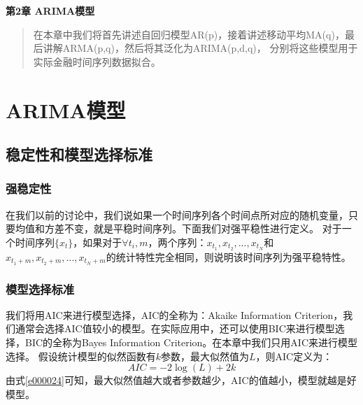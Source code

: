 \newpage
\maketitle
\begin{center}
\Large \textbf{第2章 ARIMA模型} \quad 
\end{center}
\begin{abstract}
在本章中我们将首先讲述自回归模型AR(p)，接着讲述移动平均MA(q)，最后讲解ARMA(p,q)，然后将其泛化为ARIMA(p,d,q)，
分别将这些模型用于实际金融时间序列数据拟合。
\end{abstract}
\section{ARIMA模型}
\subsection{稳定性和模型选择标准}
\subsubsection{强稳定性}
在我们以前的讨论中，我们说如果一个时间序列各个时间点所对应的随机变量，只要均值和方差不变，就是平稳时间序列。下面我们对强平稳性进行定义。\newline
对于一个时间序列$\{ x_{t} \}$，如果对于$\forall t_{i},m$，两个序列：$x_{t_1}, x_{t_2},...,x_{t_N}$和$x_{t_1+m}, x_{t_2+m},...,x_{t_N+m}$的统计特性完全相同，则说明该时间序列为强平稳特性。
\subsubsection{模型选择标准}
我们将用AIC来进行模型选择，AIC的全称为：Akaike Information Criterion，我们通常会选择AIC值较小的模型。在实际应用中，还可以使用BIC来进行模型选择，BIC的全称为Bayes Information Criterion。在本章中我们只用AIC来进行模型选择。\newline
假设统计模型的似然函数有$k$参数，最大似然值为$L$，则AIC定义为：
\begin{equation}
AIC=-2\log(L) + 2k
\label{e000024}
\end{equation}
由式\ref{e000024}可知，最大似然值越大或者参数越少，AIC的值越小，模型就越是好模型。
